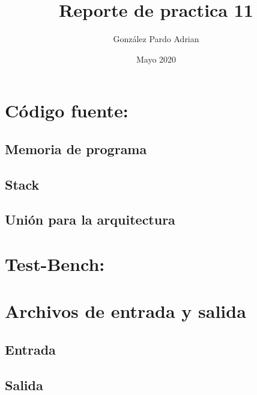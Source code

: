 \documentclass[8pt,executivepaper]{article}
\author{González Pardo Adrian}
\date{Mayo 2020}
\title{Reporte de practica 11}
\begin{document}
\maketitle
\section{Código fuente:}
\subsection{Memoria de programa}
\begin{center}
  
\end{center}
\subsection{Stack}
\begin{center}
  
\end{center}
\subsection{Unión para la arquitectura}
\begin{center}
  
\end{center}
\section{Test-Bench:}
\begin{center}
  
\end{center}
\section{Archivos de entrada y salida}
\subsection{Entrada}
\begin{center}
  
\end{center}
\clearpage
\subsection{Salida}
\begin{center}
  
\end{center}
\end{document}
